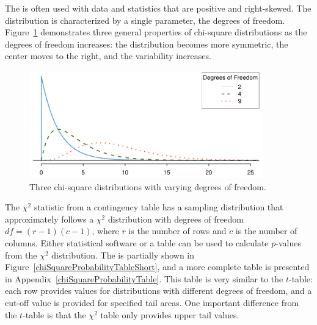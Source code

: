 The  is often used with data and statistics that are positive and right-skewed.  The distribution is characterized by a single parameter, the degrees of freedom. Figure~\ref{chiSquareDistributionWithInceasingDF} demonstrates three general properties of chi-square distributions as the degrees of freedom increases: the distribution becomes more symmetric, the center moves to the right, and the variability increases.

\begin{figure}[h]
	\centering
	\includegraphics[width=0.9\textwidth]{ch_inference_for_props_oi_biostat/figures/chiSquareDistributionWithInceasingDF/chiSquareDistributionWithInceasingDF}
	\caption{Three chi-square distributions with varying degrees of freedom.}
	\label{chiSquareDistributionWithInceasingDF}
\end{figure}

\textD{\newpage}

The $\chi^2$ statistic from a contingency table has a sampling distribution that approximately follows a $\chi^2$ distribution with degrees of freedom $df = (r-1)(c-1)$, where $r$ is the number of rows and $c$ is the number of columns. Either statistical software or a table can be used to calculate $p$-values from the $\chi^2$ distribution. The  is partially shown in Figure~\ref{chiSquareProbabilityTableShort}, and a more complete table is presented in Appendix~\vref{chiSquareProbabilityTable}. This table is very similar to the $t$-table: each row provides values for distributions with different degrees of freedom, and a cut-off value is provided for specified tail areas. One important difference from the $t$-table is that the $\chi^2$ table only provides upper tail values.

